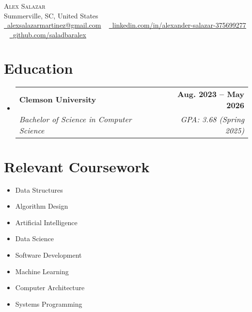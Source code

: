 \documentclass[letterpaper,11pt]{article}
\makeatletter
\newcommand{\resumeSubheading}[4]{
    \vspace{-2pt}\item[]
    \begin{tabular*}{1.0\textwidth}[t]{l@{\extracolsep{\fill}}r}
    \textbf{#1} & \textbf{\small #2} \\
    \textit{\small#3} & \textit{\small #4} \\
    \end{tabular*}\vspace{-7pt}
}
\makeatother
\begin{document}
    \begin{center}
    {\Huge \scshape Alex Salazar} \\ \vspace{1pt}
    Summerville, SC, United States \\ \vspace{1pt}
    \small \href{mailto:alexsalazarmartinez@gmail.com}{\faEnvelope\ \underline{alexsalazarmartinez@gmail.com}} ~
    \href{https://www.linkedin.com/in/alexander-salazar-375699277}{\faLinkedin\ \underline{linkedin.com/in/alexander-salazar-375699277}}  ~
    \href{https://github.com/saladbaralex}{\faGithub\ \underline{github.com/saladbaralex}}
    \vspace{-8pt}
    \end{center}

    \section{Education}
    \begin{itemize}  %
        \resumeSubheading{Clemson University}{Aug. 2023 -- May 2026}{Bachelor of Science in Computer Science}{GPA: 3.68 (Spring 2025)}
    \end{itemize}

    \section{Relevant Coursework}
    \begin{multicols}{4}
        \begin{itemize}[itemsep=-5pt, parsep=3pt]
            \item Data Structures
            \item Algorithm Design
            \item Artificial Intelligence
            \item Data Science
            \item Software Development
            \item Machine Learning
            \item Computer Architecture
            \item Systems Programming
        \end{itemize}
    \end{multicols}

\end{document}
